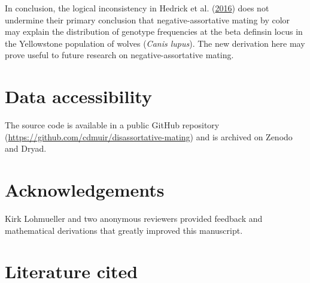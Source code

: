 \documentclass[
]{article}
\begin{document}
In conclusion, the logical inconsistency in Hedrick et al. (\protect\hyperlink{ref-hedrick_negative-assortative_2016}{2016}) does not undermine their primary conclusion that negative-assortative mating by color may explain the distribution of genotype frequencies at the beta definsin locus in the Yellowstone population of wolves (\emph{Canis lupus}). The new derivation here may prove useful to future research on negative-assortative mating.

\hypertarget{data-accessibility}{%
\section{Data accessibility}\label{data-accessibility}}

The source code is available in a public GitHub repository (\url{https://github.com/cdmuir/disassortative-mating}) and is archived on Zenodo and Dryad.

\hypertarget{acknowledgements}{%
\section{Acknowledgements}\label{acknowledgements}}

Kirk Lohmueller and two anonymous reviewers provided feedback and mathematical derivations that greatly improved this manuscript.

\hypertarget{literature-cited}{%
\section*{Literature cited}\label{literature-cited}}
\end{document}
